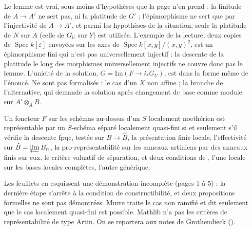 {Le lemme est vrai, sous moins d'hypothèses que la page n'en prend : la finitude de $A \to A'$ ne sert pas, ni la platitude de $G'$ ; l'épimorphisme ne sert que par l'injectivité de $A \to A'$, et parmi les hypothèses de la situation, seule la platitude de $N$ sur $A$ (celle de $G_U$ sur $Y$) est utilisée. L'exemple de la lecture, deux copies de $\operatorname{Spec} k[\varepsilon]$ envoyées sur les axes de $\operatorname{Spec} k[x, y]/(x, y)^2$, est un épimorphisme fini qui n'est pas universellement injectif : la descente de la platitude le long des morphismes universellement injectifs ne couvre donc pas le lemme. L'unicité de la solution, $G = \mathrm{Im}(F \to i_*G_U)$, est dans la forme même de l'énoncé. Ne sont pas formalisés : le cas d'un $X$ non affine ; la branche  de l'alternative, qui demande la solution après changement de base comme module sur $A' \otimes_A B$.\par}

\begin{encadre}
\begin{theoreme*}\nonverifie
Un foncteur $F$ sur les schémas au-dessus d'un $S$ localement noethérien est représentable par un $S$-schéma séparé localement quasi-fini si et seulement s'il vérifie la descente fpqc, testée sur $B \to \hat B$, la présentation finie locale, l'effectivité sur $\hat B = \varprojlim B_n$, la pro-représentabilité sur les anneaux artiniens par des anneaux finis sur eux, le critère valuatif de séparation, et deux conditions de , l'une locale sur les bases locales complètes, l'autre générique.
\end{theoreme*}
\end{encadre}
{\small Les feuillets en esquissent une démonstration incomplète (pages 1 à 5) : la dernière étape s'arrête à la condition de constructibilité, et deux propositions formelles ne sont pas démontrées. Murre traite le cas non ramifié et dit seulement que le cas localement quasi-fini est possible. Mathlib n'a pas les critères de représentabilité de type Artin. On se reportera aux notes de Grothendieck ().\par}


